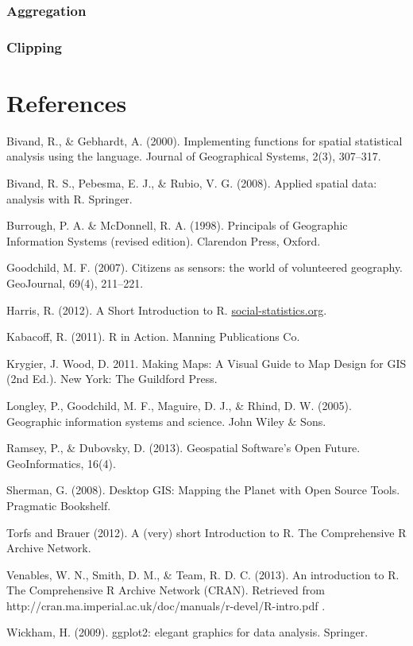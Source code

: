\documentclass[]{article}
\begin{document}
\subsubsection{Aggregation}

\subsubsection{Clipping}

\section{References}

Bivand, R., \& Gebhardt, A. (2000). Implementing functions for spatial
statistical analysis using the language. Journal of Geographical
Systems, 2(3), 307--317.

Bivand, R. S., Pebesma, E. J., \& Rubio, V. G. (2008). Applied spatial
data: analysis with R. Springer.

Burrough, P. A. \& McDonnell, R. A. (1998). Principals of Geographic
Information Systems (revised edition). Clarendon Press, Oxford.

Goodchild, M. F. (2007). Citizens as sensors: the world of volunteered
geography. GeoJournal, 69(4), 211--221.

Harris, R. (2012). A Short Introduction to R.
\href{http://www.social-statistics.org/}{social-statistics.org}.

Kabacoff, R. (2011). R in Action. Manning Publications Co.

Krygier, J. Wood, D. 2011. Making Maps: A Visual Guide to Map Design for
GIS (2nd Ed.). New York: The Guildford Press.

Longley, P., Goodchild, M. F., Maguire, D. J., \& Rhind, D. W. (2005).
Geographic information systems and science. John Wiley \& Sons.

Ramsey, P., \& Dubovsky, D. (2013). Geospatial Software's Open Future.
GeoInformatics, 16(4).

Sherman, G. (2008). Desktop GIS: Mapping the Planet with Open Source
Tools. Pragmatic Bookshelf.

Torfs and Brauer (2012). A (very) short Introduction to R. The
Comprehensive R Archive Network.

Venables, W. N., Smith, D. M., \& Team, R. D. C. (2013). An introduction
to R. The Comprehensive R Archive Network (CRAN). Retrieved from
http://cran.ma.imperial.ac.uk/doc/manuals/r-devel/R-intro.pdf .

Wickham, H. (2009). ggplot2: elegant graphics for data analysis.
Springer.
\end{document}
